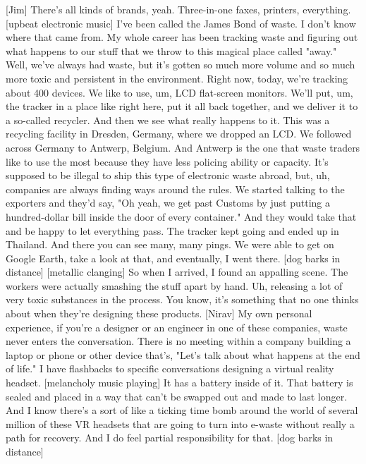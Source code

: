 \documentclass[a4paper]{article}
\begin{document}
	[Jim] There's all kinds of brands, yeah.
	Three-in-one faxes, printers, everything.
	[upbeat electronic music]
	I've been called the James Bond of waste.
	I don't know where that came from.
	My whole career has been tracking waste and figuring out what happens to our stuff
	that we throw to this magical place called "away."
	Well, we've always had waste,
	but it's gotten so much more volume and so much more toxic
	and persistent in the environment.
	Right now, today, we're tracking about 400 devices.
	We like to use, um, LCD flat-screen monitors.
	We'll put, um, the tracker in a place like right here,
	put it all back together,
	and we deliver it to a so-called recycler.
	And then we see what really happens to it.
	This was a recycling facility in Dresden, Germany,
	where we dropped an LCD.
	We followed across Germany to Antwerp, Belgium.
	And Antwerp is the one that waste traders like to use the most
	because they have less policing ability or capacity.
	It's supposed to be illegal to ship this type of electronic waste abroad,
	but, uh, companies are always finding ways around the rules.
	We started talking to the exporters and they'd say,
	"Oh yeah, we get past Customs by just putting a hundred-dollar bill
	inside the door of every container."
	And they would take that and be happy to let everything pass.
	The tracker kept going
	and ended up in Thailand.
	And there you can see many, many pings.
	We were able to get on Google Earth,
	take a look at that, and eventually, I went there.
	[dog barks in distance]
	[metallic clanging]
	So when I arrived, I found an appalling scene.
	The workers were actually smashing the stuff apart by hand.
	Uh, releasing a lot of very toxic substances in the process.
	You know, it's something that no one thinks about
	when they're designing these products.
	[Nirav] My own personal experience,
	if you're a designer or an engineer in one of these companies,
	waste never enters the conversation.
	There is no meeting within a company building a laptop
	or phone or other device
	that's, "Let's talk about what happens at the end of life."
	I have flashbacks to specific conversations
	designing a virtual reality headset.
	[melancholy music playing]
	It has a battery inside of it.
	That battery is sealed and placed in a way
	that can't be swapped out and made to last longer.
	And I know there's a sort of like a ticking time bomb
	around the world of several million of these VR headsets
	that are going to turn into e-waste without really a path for recovery.
	And I do feel partial responsibility for that.
	[dog barks in distance]
\end{document}

